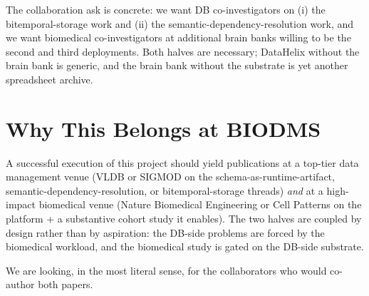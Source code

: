 \documentclass[sigconf, nonacm]{acmart}
\begin{document}
The collaboration ask is concrete: we want DB co-investigators on (i) the bitemporal-storage work and (ii) the semantic-dependency-resolution work, and we want biomedical co-investigators at additional brain banks willing to be the second and third deployments. Both halves are necessary; DataHelix without the brain bank is generic, and the brain bank without the substrate is yet another spreadsheet archive.

\section{Why This Belongs at BIODMS}

A successful execution of this project should yield publications at a top-tier data management venue (VLDB or SIGMOD on the schema-as-runtime-artifact, semantic-dependency-resolution, or bitemporal-storage threads) \emph{and} at a high-impact biomedical venue (Nature Biomedical Engineering or Cell Patterns on the platform + a substantive cohort study it enables). The two halves are coupled by design rather than by aspiration: the DB-side problems are forced by the biomedical workload, and the biomedical study is gated on the DB-side substrate.

We are looking, in the most literal sense, for the collaborators who would co-author both papers.





\end{document}
